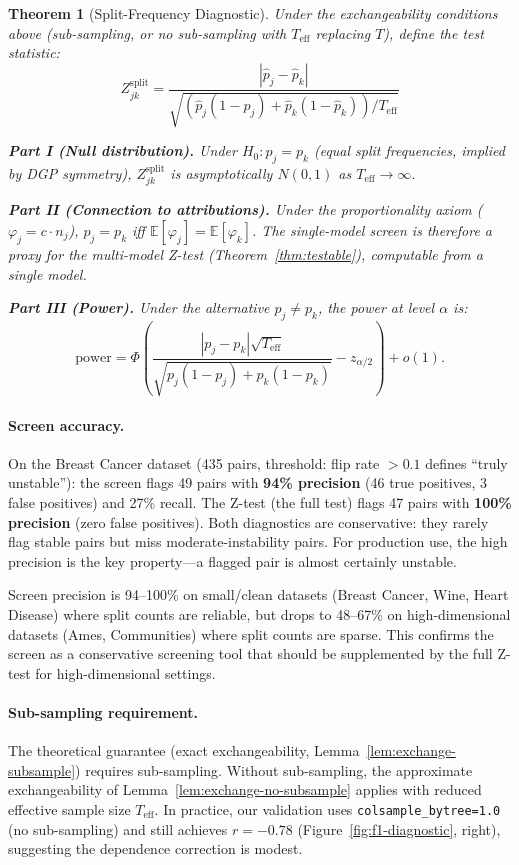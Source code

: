 \documentclass{article}
\newtheorem{theorem}{Theorem}
\newcommand{\E}{\mathbb{E}}
\begin{document}
\begin{theorem}[Split-Frequency Diagnostic]
\label{thm:split-diagnostic}
Under the exchangeability conditions above (sub-sampling, or no sub-sampling with $T_{\text{eff}}$ replacing $T$), define the test statistic:
\[
    Z^{\text{split}}_{jk} = \frac{|\hat{p}_j - \hat{p}_k|}{\sqrt{(\hat{p}_j(1-\hat{p}_j) + \hat{p}_k(1-\hat{p}_k))/T_{\text{eff}}}}
\]

\textbf{Part I (Null distribution).} Under $H_0: p_j = p_k$ (equal split frequencies, implied by DGP symmetry), $Z^{\text{split}}_{jk}$ is asymptotically $N(0,1)$ as $T_{\text{eff}} \to \infty$.

\textbf{Part II (Connection to attributions).} Under the proportionality axiom ($\varphi_j = c \cdot n_j$), $p_j = p_k$ iff $\E[\varphi_j] = \E[\varphi_k]$. The single-model screen is therefore a proxy for the multi-model Z-test (Theorem~\ref{thm:testable}), computable from a single model.

\textbf{Part III (Power).} Under the alternative $p_j \neq p_k$, the power at level $\alpha$ is:
\[
    \text{power} = \Phi\!\left(\frac{|p_j - p_k|\sqrt{T_{\text{eff}}}}{\sqrt{p_j(1-p_j) + p_k(1-p_k)}} - z_{\alpha/2}\right) + o(1).
\]
\end{theorem}

\paragraph{Screen accuracy.}
On the Breast Cancer dataset (435 pairs, threshold: flip rate $> 0.1$ defines ``truly unstable''): the screen flags 49 pairs with \textbf{94\% precision} (46 true positives, 3 false positives) and 27\% recall. The Z-test (the full test) flags 47 pairs with \textbf{100\% precision} (zero false positives). Both diagnostics are conservative: they rarely flag stable pairs but miss moderate-instability pairs. For production use, the high precision is the key property---a flagged pair is almost certainly unstable.

Screen precision is 94--100\% on small/clean datasets (Breast Cancer, Wine, Heart Disease) where split counts are reliable, but drops to 48--67\% on high-dimensional datasets (Ames, Communities) where split counts are sparse. This confirms the screen as a conservative screening tool that should be supplemented by the full Z-test for high-dimensional settings.

\paragraph{Sub-sampling requirement.}
The theoretical guarantee (exact exchangeability,
Lemma~\ref{lem:exchange-subsample}) requires sub-sampling.
Without sub-sampling, the approximate exchangeability of
Lemma~\ref{lem:exchange-no-subsample} applies with reduced effective
sample size $T_{\text{eff}}$.
In practice, our validation uses \texttt{colsample\_bytree=1.0}
(no sub-sampling) and still achieves $r = -0.78$
(Figure~\ref{fig:f1-diagnostic}, right), suggesting the dependence
correction is modest.
\end{document}

